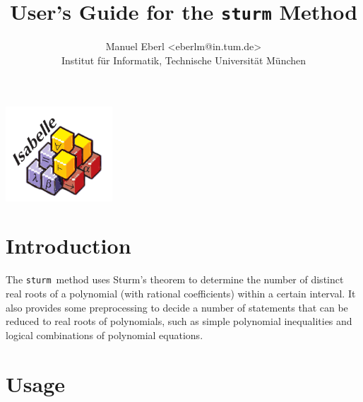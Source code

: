 \documentclass[11pt,a4paper,oneside]{article}
\title{\LARGE User's Guide for the \texttt{sturm} Method\\[4mm]}
\author{\Large Manuel Eberl <eberlm@in.tum.de>\\[1mm]\large Institut für Informatik, Technische Universität München\\[4mm]}
\newcommand{\sturm}{\texttt{sturm}}
\begin{document}
\begin{center}
\vspace*{20mm}
\includegraphics[width=4cm]{isabelle.pdf}
\end{center}
\vspace*{-5mm}
{\let\newpage\relax\maketitle}
\vspace*{10mm}
\tableofcontents
\newpage

\section{Introduction}

The \sturm\ method uses Sturm's theorem to determine the number of distinct real roots of a polynomial (with rational coefficients) within a certain interval. It also provides some preprocessing to decide a number of statements that can be reduced to real roots of polynomials, such as simple polynomial inequalities and logical combinations of polynomial equations.

\section{Usage}
\end{document}
